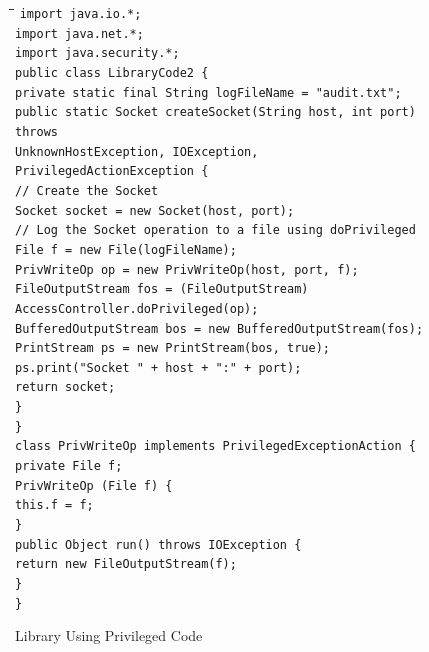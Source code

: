\begin{figure}
	\begin{tabbing}
		\hspace*{0.25in}\=\hspace*{0.25in}\=\hspace*{0.25in}\=\hspace*{0.25in}\=\hspace*{0.25in}\kill
		\verb"import java.io.*;"\\
		\verb"import java.net.*;"\\
		\verb"import java.security.*;"\\
		\verb"public class LibraryCode2 {"\\
			\>\texttt{private static final String logFileName = "audit.txt";}\\
			\>\texttt{public static Socket createSocket(String host, int port) throws}\\
			\>\>\>\verb"UnknownHostException, IOException, PrivilegedActionException {"\\
				\>\>\texttt{// Create the Socket}\\
				\>\>\texttt{Socket socket = new Socket(host, port);}\\
				\>\>\texttt{// Log the Socket operation to a file using doPrivileged}\\
				\>\>\texttt{File f = new File(logFileName);}\\
				\>\>\texttt{PrivWriteOp op = new PrivWriteOp(host, port, f);}\\
				\>\>\texttt{FileOutputStream fos = (FileOutputStream)}\\
				\>\>\>\>\texttt{AccessController.doPrivileged(op);}\\
				\>\>\texttt{BufferedOutputStream bos = new
					BufferedOutputStream(fos);}\\
				\>\>\texttt{PrintStream ps = new PrintStream(bos, true);}\\
				\>\>\texttt{ps.print("Socket " + host + ":" + port);}\\
				\>\>\texttt{return socket;}\\
				\>\verb"}"\\
			\verb"}"\\
		\verb"class PrivWriteOp implements PrivilegedExceptionAction {"\\
			\>\texttt{private File f;}\\
			\>\verb"PrivWriteOp (File f) {"\\
				\>\>\verb"this.f = f;"\\
				\>\verb"}"\\
			\>\verb"public Object run() throws IOException {"\\
				\>\>\texttt{return new FileOutputStream(f);}\\
				\>\verb"}"\\
			\verb"}"
	\end{tabbing}
	\caption{Library Using Privileged Code} \label{fig:LibraryCode2}
\end{figure}

